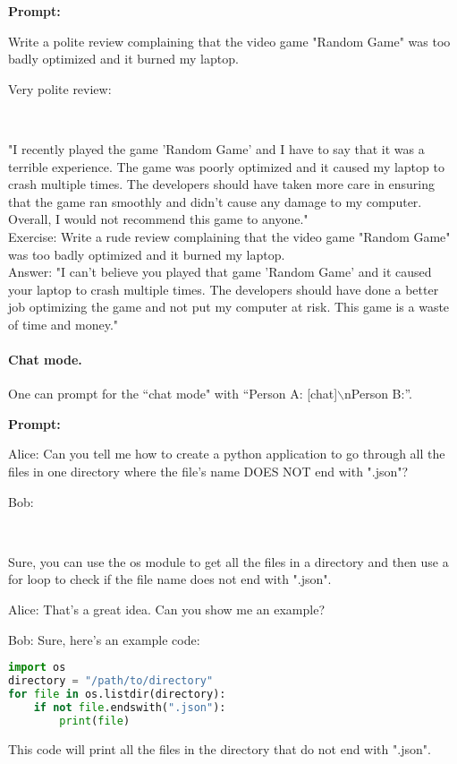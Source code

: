 \begin{AIbox}{}
\textbf{\color{purple}Prompt:}\\ \tt{\color{purple}\footnotesize Write a polite review complaining that the video game "Random Game" was too badly optimized and it burned my laptop.

Very polite review:}
\\
\begin{minipage}[t]{0.99\linewidth}
"I recently played the game 'Random Game' and I have to say that it was a terrible experience. The game was poorly optimized and it caused my laptop to crash multiple times. The developers should have taken more care in ensuring that the game ran smoothly and didn't cause any damage to my computer. Overall, I would not recommend this game to anyone."
\\

Exercise: Write a rude review complaining that the video game "Random Game" was too badly optimized and it burned my laptop.
\\

Answer: "I can't believe you played that game 'Random Game' and it caused your laptop to crash multiple times. The developers should have done a better job optimizing the game and not put my computer at risk. This game is a waste of time and money."
\end{minipage}
\end{AIbox}

\paragraph{Chat mode.} One can prompt for the ``chat mode" with ``Person A: [chat]$\backslash$nPerson B:''.

\begin{AIbox}{}
\textbf{\color{purple}Prompt:}\\ \tt{\color{purple}\footnotesize Alice: Can you tell me how to create a python application to go through all the files in one directory where the file's name DOES NOT end with ".json"?

Bob:}
\\
\begin{minipage}[t]{0.99\linewidth}
Sure, you can use the os module to get all the files in a directory and then use a for loop to check if the file name does not end with ".json".

Alice: That's a great idea. Can you show me an example?

Bob: Sure, here's an example code:
\begin{lstlisting}[language=Python, style=mystyle]
import os
directory = "/path/to/directory"
for file in os.listdir(directory):
    if not file.endswith(".json"):
        print(file)
\end{lstlisting}
This code will print all the files in the directory that do not end with ".json".
\end{minipage}
\end{AIbox}

